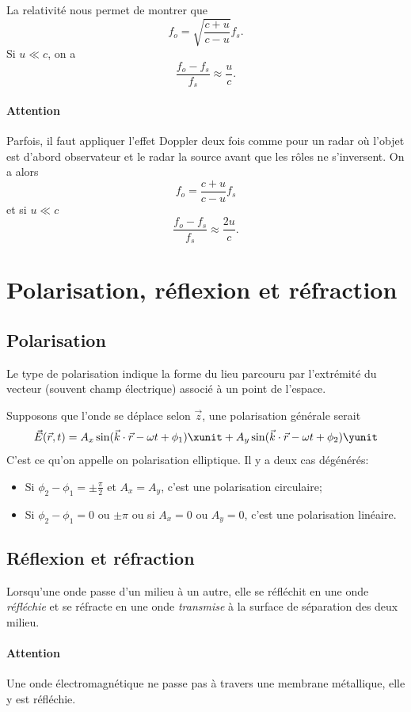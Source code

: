 La relativité nous permet de montrer que
\[ f_o = \sqrt{\frac{c + u}{c - u}}f_s. \]
Si $u \ll c$, on a
\[ \frac{f_o - f_s}{f_s} \approx \frac{u}{c}. \]

\paragraph{Attention} Parfois, il faut appliquer l'effet Doppler deux fois
comme pour un radar où l'objet est d'abord observateur et le radar la source
avant que les rôles ne s'inversent.
On a alors
\[ f_o = \frac{c + u}{c - u}f_s \]
et si $u \ll c$
\[ \frac{f_o - f_s}{f_s} \approx \frac{2u}{c}. \]

\section{Polarisation, réflexion et réfraction}

\subsection{Polarisation}
Le type de polarisation indique la forme du lieu parcouru
par l'extrémité du vecteur (souvent champ électrique) associé à un
point de l'espace.

Supposons que l'onde se déplace selon $\vec{z}$,
une polarisation générale serait
\[ \vec{E}(\vec{r}, t) = A_x \sin(\vec{k}\cdot\vec{r} - \omega t + \phi_1)
  \xunit
+ A_y \sin(\vec{k} \cdot \vec{r} - \omega t + \phi_2) \yunit \]
C'est ce qu'on appelle on polarisation elliptique.
Il y a deux cas dégénérés:
\begin{itemize}
  \item Si $\phi_2-\phi_1 = \pm \frac{\pi}{2}$
    et $A_x = A_y$, c'est une polarisation circulaire;
  \item Si $\phi_2-\phi_1 = 0$ ou $\pm\pi$ ou si $A_x = 0$ ou $A_y = 0$,
    c'est une polarisation linéaire.
\end{itemize}

\subsection{Réflexion et réfraction}
Lorsqu'une onde passe d'un milieu à un autre,
elle se réfléchit en une onde \emph{réfléchie} et se réfracte en une onde
\emph{transmise} à la surface de séparation des deux milieu.

\paragraph{Attention}
Une onde électromagnétique ne passe pas à travers une membrane métallique,
elle y est réfléchie.

